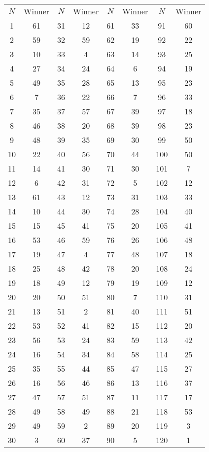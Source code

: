 \documentclass{article}
\begin{document}
\begin{center}
\begin{tabular*}{0.8\textwidth}{@{\extracolsep{\fill}} cccccccc}
$N$ & Winner & $N$ & Winner & $N$ & Winner & $N$ & Winner \\
\cline{1-2} \cline{3-4} \cline{5-6} \cline{7-8}
1  & 61 & 31 & 12 & 61 & 33 & 91  & 60 \\
2  & 59 & 32 & 59 & 62 & 19 & 92  & 22 \\
3  & 10 & 33 & 4  & 63 & 14 & 93  & 25 \\
4  & 27 & 34 & 24 & 64 & 6  & 94  & 19 \\
5  & 49 & 35 & 28 & 65 & 13 & 95  & 23 \\
6  & 7  & 36 & 22 & 66 & 7  & 96  & 33 \\
7  & 35 & 37 & 57 & 67 & 39 & 97  & 18 \\
8  & 46 & 38 & 20 & 68 & 39 & 98  & 23 \\
9  & 48 & 39 & 35 & 69 & 30 & 99  & 50 \\
10 & 22 & 40 & 56 & 70 & 44 & 100 & 50 \\
11 & 14 & 41 & 30 & 71 & 30 & 101 & 7  \\
12 & 6  & 42 & 31 & 72 & 5  & 102 & 12 \\
13 & 61 & 43 & 12 & 73 & 31 & 103 & 33 \\
14 & 10 & 44 & 30 & 74 & 28 & 104 & 40 \\
15 & 15 & 45 & 41 & 75 & 20 & 105 & 41 \\
16 & 53 & 46 & 59 & 76 & 26 & 106 & 48 \\
17 & 19 & 47 & 4  & 77 & 48 & 107 & 18 \\
18 & 25 & 48 & 42 & 78 & 20 & 108 & 24 \\
19 & 18 & 49 & 12 & 79 & 19 & 109 & 12 \\
20 & 20 & 50 & 51 & 80 & 7  & 110 & 31 \\
21 & 13 & 51 & 2  & 81 & 40 & 111 & 51 \\
22 & 53 & 52 & 41 & 82 & 15 & 112 & 20 \\
23 & 56 & 53 & 24 & 83 & 59 & 113 & 42 \\
24 & 16 & 54 & 34 & 84 & 58 & 114 & 25 \\
25 & 35 & 55 & 44 & 85 & 47 & 115 & 27 \\
26 & 16 & 56 & 46 & 86 & 13 & 116 & 37 \\
27 & 47 & 57 & 51 & 87 & 11 & 117 & 17 \\
28 & 49 & 58 & 49 & 88 & 21 & 118 & 53 \\
29 & 49 & 59 & 2  & 89 & 20 & 119 & 3  \\
30 & 3  & 60 & 37 & 90 & 5  & 120 & 1  \\
\end{tabular*}
\end{center}
\end{document}
